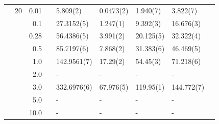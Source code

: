 \begin{table}[H]
\begin{tabularx}{\textwidth}{R{1cm}rrcR{2.3cm}R{2.3cm}R{2.3cm}R{2.3cm}R{1cm}}
		&20 & 0.01 && 5.809(2) & 0.0473(2) & 1.940(7) & 3.822(7) \\
		&& 0.1 && 27.3152(5) & 1.247(1) & 9.392(3) & 16.676(3) \\
		&& 0.28 && 56.4386(5) & 3.991(2) & 20.125(5) & 32.322(4) \\
		&& 0.5 && 85.7197(6) & 7.868(2) & 31.383(6) & 46.469(5) \\
		&& 1.0 && 142.9561(7) & 17.29(2) & 54.45(3) & 71.218(6) \\
		&& 2.0 && - & - & - & -\\
		&& 3.0 && 332.6976(6) & 67.976(5) & 119.95(1) & 144.772(7) \\ 
		&& 5.0 && - & - & - & -\\
		&& 10.0 && - & - & - & -\\
		\hline \hline
	\end{tabularx}
\end{table}

